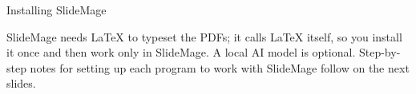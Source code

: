 

\begin{sectionframe}{Installing SlideMage}
	\begin{minipage}[t]{0.9\linewidth}\small
		SlideMage needs LaTeX to typeset the PDFs; it calls LaTeX itself, so you install it once and then work only in SlideMage. A local AI model is optional. Step-by-step notes for setting up each program to work with SlideMage follow on the next slides.
	\end{minipage}\par\medskip
	\SMChapterAgenda
\end{sectionframe}

